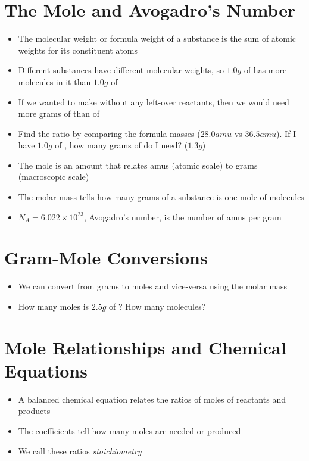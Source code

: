 \documentclass[12pt, openany, letterpaper]{memoir}
\begin{document}
\section{The Mole and Avogadro's Number}
\begin{itemize}
	\item The molecular weight or formula weight of a substance is the sum of atomic weights for its constituent atoms
	\item Different substances have different molecular weights, so $1.0g$ of  has more molecules in it than $1.0g$ of 
	\item If we wanted to make  without any left-over reactants, then we would need more grams of  than of 
	\item Find the ratio by comparing the formula masses ($28.0amu$ vs $36.5amu$). If I have $1.0g$ of , how many grams of  do I need? ($1.3g$)
	\item The mole is an amount that relates amus (atomic scale) to grams (macroscopic scale)
	\item The molar mass tells how many grams of a substance is one mole of molecules
	\item $N_A=6.022\times10^{23}$, Avogadro's number, is the number of amus per gram
\end{itemize}

\section{Gram-Mole Conversions}
\begin{itemize}
	\item We can convert from grams to moles and vice-versa using the molar mass
	\item How many moles is $2.5g$ of ? How many molecules?
\end{itemize}

\section{Mole Relationships and Chemical Equations}
\begin{itemize}
	\item A balanced chemical equation relates the ratios of moles of reactants and products
	\item The coefficients tell how many moles are needed or produced
	\item We call these ratios \emph{stoichiometry}
\end{itemize}
\end{document}

